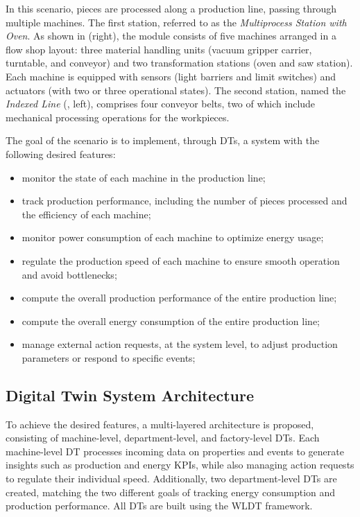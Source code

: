 In this scenario, pieces are processed along a production line, passing through multiple machines.
%
The first station, referred to as the \textit{Multiprocess Station with Oven}.
As shown in  (right), the module consists of five machines arranged in a flow shop layout: 
three material handling units (vacuum gripper carrier, turntable, and conveyor)
and two transformation stations (oven and saw station).
%
Each machine is equipped with sensors (light barriers and limit switches) and actuators (with two or three operational states).
%
The second station, named the \textit{Indexed Line} (, left), comprises four conveyor belts, two of which include mechanical processing operations for the workpieces.

The goal of the scenario is to implement, through \acp{DT}, a system with the following desired features: 
\begin{itemize}
    \item monitor the state of each machine in the production line;
    \item track production performance, including the number of pieces processed and the efficiency of each machine;
    \item monitor power consumption of each machine to optimize energy usage;
    \item regulate the production speed of each machine to ensure smooth operation and avoid bottlenecks;
    \item compute the overall production performance of the entire production line;
    \item compute the overall energy consumption of the entire production line;
    \item manage external action requests, at the system level, to adjust production parameters or respond to specific events;
\end{itemize} 

\subsection{Digital Twin System Architecture}

To achieve the desired features, a multi-layered architecture is proposed, consisting of machine-level, department-level, and factory-level \acp{DT}.
%
Each machine-level \ac{DT} processes incoming data on properties and events to generate insights such as production and energy KPIs, while also managing action requests to regulate their individual speed.
%
Additionally, two department-level \acp{DT} are created, matching the two different goals of tracking energy consumption and production performance.
%
All \acp{DT} are built using the \ac{WLDT} framework.


